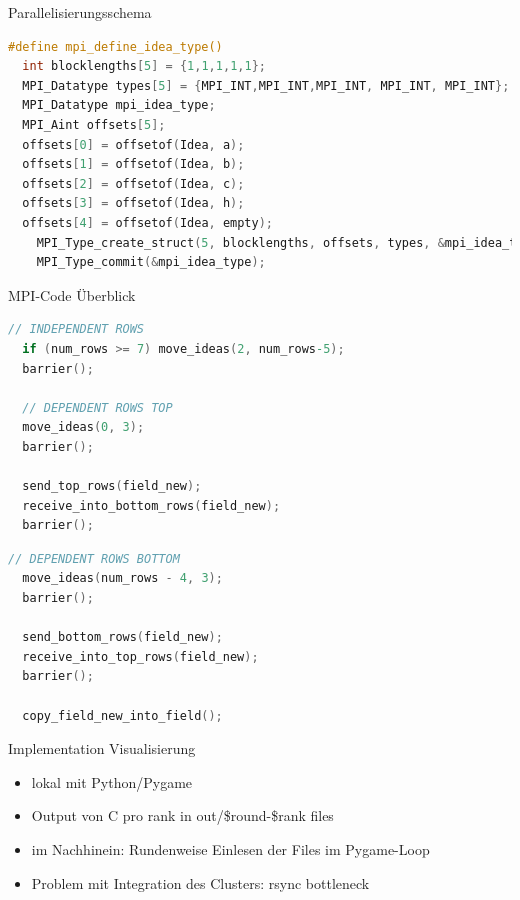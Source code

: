 \begin{frame}[fragile]{Parallelisierungsschema}
\begin{lstlisting}[language=C,basicstyle=\small,breaklines=true,keywordstyle=\color{black}]
#define mpi_define_idea_type()                                               
  int blocklengths[5] = {1,1,1,1,1};                                  
  MPI_Datatype types[5] = {MPI_INT,MPI_INT,MPI_INT, MPI_INT, MPI_INT};       
  MPI_Datatype mpi_idea_type;                                                
  MPI_Aint offsets[5];                                                   
  offsets[0] = offsetof(Idea, a);                                            
  offsets[1] = offsetof(Idea, b);                                            
  offsets[2] = offsetof(Idea, c);                                            
  offsets[3] = offsetof(Idea, h);                                            
  offsets[4] = offsetof(Idea, empty);                                        
    MPI_Type_create_struct(5, blocklengths, offsets, types, &mpi_idea_type); 
    MPI_Type_commit(&mpi_idea_type);                                         
\end{lstlisting}
\end{frame}

\begin{frame}{MPI-Code Überblick}
\begin{lstlisting}[language=C,basicstyle=\small,breaklines=true,keywordstyle=\color{black}]
  // INDEPENDENT ROWS
  if (num_rows >= 7) move_ideas(2, num_rows-5);
  barrier();

  // DEPENDENT ROWS TOP
  move_ideas(0, 3); 
  barrier();

  send_top_rows(field_new);
  receive_into_bottom_rows(field_new);
  barrier();
\end{lstlisting}
\framebreak
\begin{lstlisting}[language=C,basicstyle=\small,breaklines=true,keywordstyle=\color{black}]
  // DEPENDENT ROWS BOTTOM
  move_ideas(num_rows - 4, 3);  
  barrier();

  send_bottom_rows(field_new);
  receive_into_top_rows(field_new);
  barrier();

  copy_field_new_into_field();
\end{lstlisting}
\end{frame}

\begin{frame}{Implementation Visualisierung}
	\begin{itemize}
		\item lokal mit Python/Pygame
		\item Output von C pro rank in out/\$round-\$rank files
		\item im Nachhinein: Rundenweise Einlesen der Files im Pygame-Loop
		\item Problem mit Integration des Clusters: rsync bottleneck
	\end{itemize}
\end{frame}

